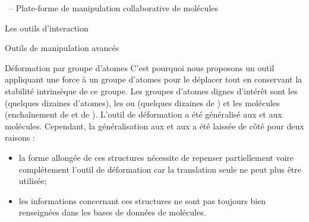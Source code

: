 \documentclass[myfrancais,ngerman,english,frenchb]{mythesis}
\begin{document}
\begin{mychapter}{\myShaddock\ -- Plate-forme de manipulation collaborative de molécules}
\begin{mysection}{Les outils d'interaction}
\begin{mysubsection}{Outils de manipulation avancés}
\begin{mysubsubsection}{Déformation par groupe d'atomes}
					C'est pourquoi nous proposons un outil appliquant une force à un groupe d'atomes pour le déplacer tout en conservant la stabilité intrinsèque de ce groupe.
					Les groupes d'atomes dignes d'intérêt sont les  (quelques dizaines d'atomes), les \myhelice* ou \myfeuillet* (quelques dizaines de ) et les molécules (enchaînement de \myhelice* et de \myfeuillet*).
					L'outil de déformation a été généralisé aux  et aux molécules.
					Cependant, la généralisation aux \myhelice* et aux \myfeuillet* a été laissée de côté pour deux raisons :
					\begin{itemize}
						\item la forme allongée de ces structures nécessite de repenser partiellement voire complétement l'outil de déformation car la translation seule ne peut plus être utilisée;
						\item les informations concernant ces structures ne sont pas toujours bien renseignées dans les bases de données de molécules.
					\end{itemize}


\end{mysubsubsection}
\end{mysubsection}
\end{mysection}
\end{mychapter}
\end{document}

